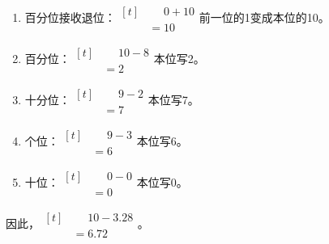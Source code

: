 {\begin{enumerate}[leftmargin=1.7em,itemsep=5pt,topsep=0pt]
\item 百分位接收退位：\(\begin{aligned}[t]&\phantom{={}}0+10\\&=10\end{aligned}\)\quad 前一位的1变成本位的10。
\item 百分位：\(\begin{aligned}[t]&\phantom{={}}10-8\\&=2\end{aligned}\)\quad 本位写2。
\item 十分位：\(\begin{aligned}[t]&\phantom{={}}9-2\\&=7\end{aligned}\)\quad 本位写7。
\item 个位：\(\begin{aligned}[t]&\phantom{={}}9-3\\&=6\end{aligned}\)\quad 本位写6。
\item 十位：\(\begin{aligned}[t]&\phantom{={}}0-0\\&=0\end{aligned}\)\quad 本位写0。
\end{enumerate}
\par\smallskip
因此，\(\begin{aligned}[t]&\phantom{={}}10-3.28\\&=6.72\end{aligned}\)。
\par\medskip

}
